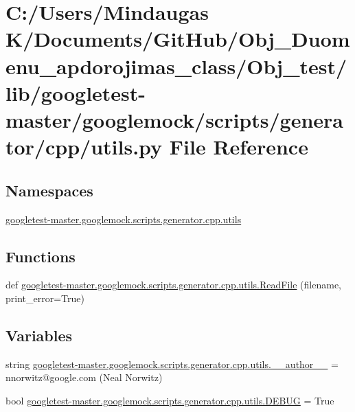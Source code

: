\hypertarget{_obj__test_2lib_2googletest-master_2googlemock_2scripts_2generator_2cpp_2utils_8py}{}\section{C\+:/\+Users/\+Mindaugas K/\+Documents/\+Git\+Hub/\+Obj\+\_\+\+Duomenu\+\_\+apdorojimas\+\_\+class/\+Obj\+\_\+test/lib/googletest-\/master/googlemock/scripts/generator/cpp/utils.py File Reference}
\label{_obj__test_2lib_2googletest-master_2googlemock_2scripts_2generator_2cpp_2utils_8py}
\subsection*{Namespaces}
\begin{DoxyCompactItemize}
\item 
 \mbox{\hyperlink{namespacegoogletest-master_1_1googlemock_1_1scripts_1_1generator_1_1cpp_1_1utils}{googletest-\/master.\+googlemock.\+scripts.\+generator.\+cpp.\+utils}}
\end{DoxyCompactItemize}
\subsection*{Functions}
\begin{DoxyCompactItemize}
\item 
def \mbox{\hyperlink{namespacegoogletest-master_1_1googlemock_1_1scripts_1_1generator_1_1cpp_1_1utils_ad4ab88b845b6ae790c3045ee515d7a8e}{googletest-\/master.\+googlemock.\+scripts.\+generator.\+cpp.\+utils.\+Read\+File}} (filename, print\+\_\+error=True)
\end{DoxyCompactItemize}
\subsection*{Variables}
\begin{DoxyCompactItemize}
\item 
string \mbox{\hyperlink{namespacegoogletest-master_1_1googlemock_1_1scripts_1_1generator_1_1cpp_1_1utils_a2bc2491421940b8ca4f8ab971677949e}{googletest-\/master.\+googlemock.\+scripts.\+generator.\+cpp.\+utils.\+\_\+\+\_\+author\+\_\+\+\_\+}} = \textquotesingle{}nnorwitz@google.\+com (Neal Norwitz)\textquotesingle{}
\item 
bool \mbox{\hyperlink{namespacegoogletest-master_1_1googlemock_1_1scripts_1_1generator_1_1cpp_1_1utils_a08988e3ca9442879c3f024b727b62d68}{googletest-\/master.\+googlemock.\+scripts.\+generator.\+cpp.\+utils.\+D\+E\+B\+UG}} = True
\end{DoxyCompactItemize}
